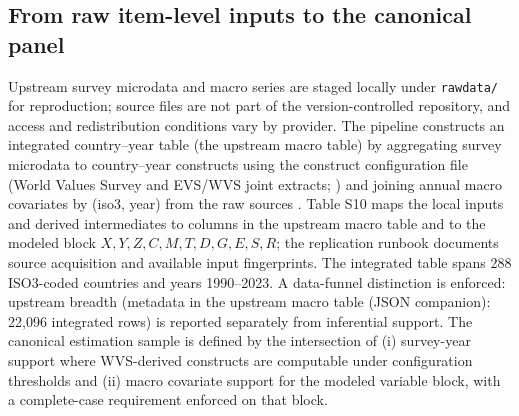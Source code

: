 \documentclass[11pt]{article}
\begin{document}
\subsection*{From raw item-level inputs to the canonical panel}
Upstream survey microdata and macro series are staged locally under \texttt{rawdata/} for reproduction; source files are not part of the version-controlled repository, and access and redistribution conditions vary by provider. The pipeline constructs an integrated country--year table (the upstream macro table) by aggregating survey microdata to country--year constructs using the construct configuration file (World Values Survey and EVS/WVS joint extracts; \parencite{WVS2022Wave7,WVS_TimeSeries_1981_2022,EVSWVSJoint2020}) and joining annual macro covariates by (iso3, year) from the raw sources \parencite{WorldBankWDI2024,OECDIDD2024,OECDSOCX2025,UNDPHDR2025,UCDP2025,UCDPGED2025,EMDAT2025}. Table S10 maps the local inputs and derived intermediates to columns in the upstream macro table and to the modeled block $X,Y,Z,C,M,T,D,G,E,S,R$; the replication runbook documents source acquisition and available input fingerprints. The integrated table spans 288 ISO3-coded countries and years 1990--2023. A data-funnel distinction is enforced: upstream breadth (metadata in the upstream macro table (JSON companion): 22,096 integrated rows) is reported separately from inferential support. The canonical estimation sample is defined by the intersection of (i) survey-year support where WVS-derived constructs are computable under configuration thresholds and (ii) macro covariate support for the modeled variable block, with a complete-case requirement enforced on that block.
\end{document}
